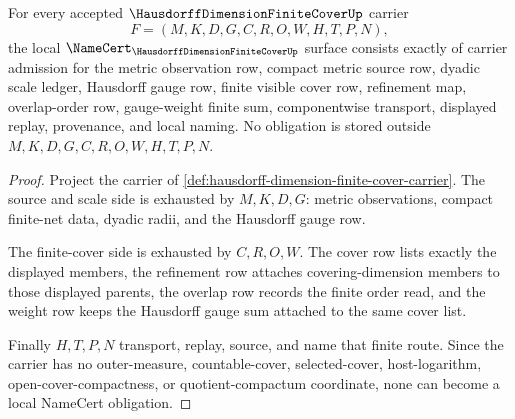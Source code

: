 \begin{theorem}
\label{thm:hausdorff-dimension-finite-cover-namecert-obligations}
For every accepted $\HausdorffDimensionFiniteCoverUp$ carrier
$$
F=(M,K,D,G,C,R,O,W,H,T,P,N),
$$
the local $\NameCert_{\HausdorffDimensionFiniteCoverUp}$ surface consists exactly of carrier admission for the metric observation row, compact metric source row, dyadic scale ledger, Hausdorff gauge row, finite visible cover row, refinement map, overlap-order row, gauge-weight finite sum, componentwise transport, displayed replay, provenance, and local naming. No obligation is stored outside $M,K,D,G,C,R,O,W,H,T,P,N$.
\end{theorem}
\begin{proof}
Project the carrier of \autoref{def:hausdorff-dimension-finite-cover-carrier}. The source and scale side is exhausted by $M,K,D,G$: metric observations, compact finite-net data, dyadic radii, and the Hausdorff gauge row.

The finite-cover side is exhausted by $C,R,O,W$. The cover row lists exactly the displayed members, the refinement row attaches covering-dimension members to those displayed parents, the overlap row records the finite order read, and the weight row keeps the Hausdorff gauge sum attached to the same cover list.

Finally $H,T,P,N$ transport, replay, source, and name that finite route. Since the carrier has no outer-measure, countable-cover, selected-cover, host-logarithm, open-cover-compactness, or quotient-compactum coordinate, none can become a local NameCert obligation.
\end{proof}

